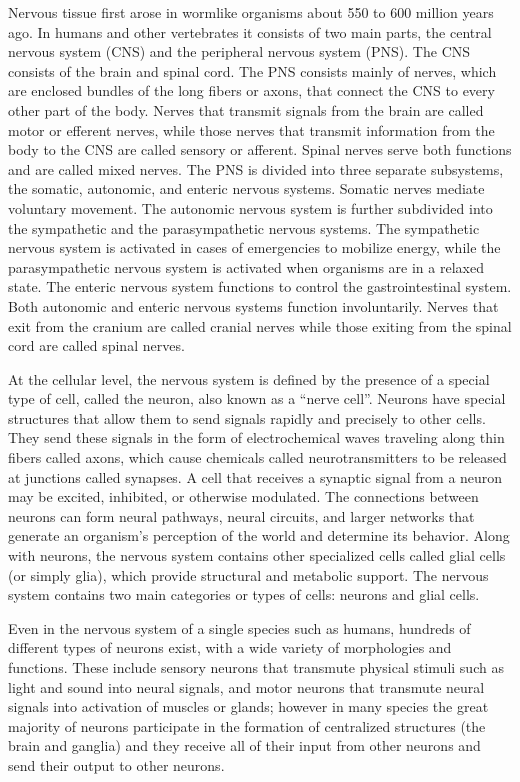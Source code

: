 Nervous tissue first arose in wormlike organisms about 550 to 600 million years ago. In humans and other vertebrates it consists of two main parts, the central nervous system (CNS) and the peripheral nervous system (PNS). The CNS consists of the brain and spinal cord. The PNS consists mainly of nerves, which are enclosed bundles of the long fibers or axons, that connect the CNS to every other part of the body. Nerves that transmit signals from the brain are called motor or efferent nerves, while those nerves that transmit information from the body to the CNS are called sensory or afferent. Spinal nerves serve both functions and are called mixed nerves. The PNS is divided into three separate subsystems, the somatic, autonomic, and enteric nervous systems. Somatic nerves mediate voluntary movement. The autonomic nervous system is further subdivided into the sympathetic and the parasympathetic nervous systems. The sympathetic nervous system is activated in cases of emergencies to mobilize energy, while the parasympathetic nervous system is activated when organisms are in a relaxed state. The enteric nervous system functions to control the gastrointestinal system. Both autonomic and enteric nervous systems function involuntarily. Nerves that exit from the cranium are called cranial nerves while those exiting from the spinal cord are called spinal nerves.

At the cellular level, the nervous system is defined by the presence of a special type of cell, called the neuron, also known as a ``nerve cell''. Neurons have special structures that allow them to send signals rapidly and precisely to other cells. They send these signals in the form of electrochemical waves traveling along thin fibers called axons, which cause chemicals called neurotransmitters to be released at junctions called synapses. A cell that receives a synaptic signal from a neuron may be excited, inhibited, or otherwise modulated. The connections between neurons can form neural pathways, neural circuits, and larger networks that generate an organism's perception of the world and determine its behavior. Along with neurons, the nervous system contains other specialized cells called glial cells (or simply glia), which provide structural and metabolic support.
The nervous system contains two main categories or types of cells: neurons and glial cells.

Even in the nervous system of a single species such as humans, hundreds of different types of neurons exist, with a wide variety of morphologies and functions. These include sensory neurons that transmute physical stimuli such as light and sound into neural signals, and motor neurons that transmute neural signals into activation of muscles or glands; however in many species the great majority of neurons participate in the formation of centralized structures (the brain and ganglia) and they receive all of their input from other neurons and send their output to other neurons.


